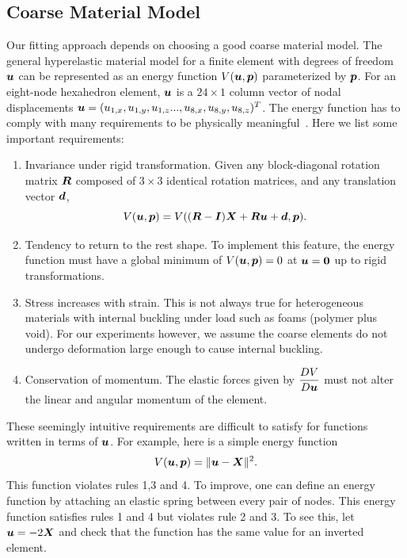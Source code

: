 \subsection{Coarse Material Model}
Our fitting approach depends on choosing a good coarse material model.
The general hyperelastic material model for a finite element with degrees of freedom $\mathbf{\mbox{$\bm{u}$}}$
can be represented as an energy function $V(\mbox{$\bm{u}$},\mbox{$\bm{p}$})$ parameterized by $\mbox{$\bm{p}$}$.
For an eight-node hexahedron element, $\mbox{$\bm{u}$}$ is a $24\times 1$ column vector of nodal displacements
$\mbox{$\bm{u}$}=(u_{1,x}, u_{1,y},u_{1,z}...,u_{8,x}, u_{8,y},u_{8,z})^T$.
The energy function has to comply with many requirements to be physically meaningful~\cite{Marsden2012}.
Here we list some important requirements:
\begin{enumerate}
	\item Invariance under rigid transformation. Given any block-diagonal rotation matrix $\mbox{$\bm{R}$}$ composed of
	$3\times 3$ identical rotation matrices, and any translation vector $\mbox{$\bm{d}$}$,
	\[
	V(\mbox{$\bm{u}$},\mbox{$\bm{p}$}) = V( (\mbox{$\bm{R}$}-\mbox{$\bm{I}$})\mbox{$\bm{X}$}+\mbox{$\bm{R}$}\mbox{$\bm{u}$}+\mbox{$\bm{d}$},\mbox{$\bm{p}$}).
	\]
	\item Tendency to return to the rest shape.
	To implement this feature, the energy function must have a global minimum of
	$V(\mbox{$\bm{u}$},\mbox{$\bm{p}$})=0$ at $\mbox{$\bm{u}$}=\mbox{$\bm{0}$}$ up to rigid transformations.
	\item Stress increases with strain. This is not always true for heterogeneous materials 
	with internal buckling under load such as foams (polymer plus void).
	For our experiments however, we assume the coarse elements do not undergo deformation large enough to cause internal buckling.
	\item Conservation of momentum. The elastic forces given by
	$\dfrac{DV}{D\mbox{$\bm{u}$}}$ must not alter the linear and angular momentum of the element.
\end{enumerate}
These seemingly intuitive requirements are difficult to satisfy for functions written in
terms of $\mbox{$\bm{u}$}$.
For example, here is a simple energy function
\[
V(\mbox{$\bm{u}$},\mbox{$\bm{p}$})=\|\mbox{$\bm{u}$}-\mbox{$\bm{X}$}\|^2.
\]
This function violates rules 1,3 and 4.
To improve, one can define an energy function by attaching an elastic spring
between every pair of nodes.
This energy function satisfies rules 1 and 4 but violates rule 2 and 3.
To see this, let $\mbox{$\bm{u}$}=-2\mbox{$\bm{X}$}$ and check that
the function has the same value for an inverted element.

